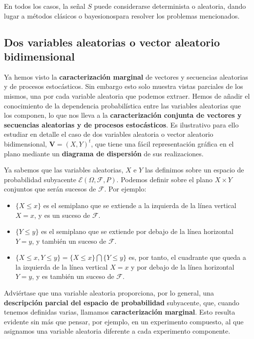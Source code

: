 \documentclass[11pt]{article}
\providecommand{\tightlist}{%
      \setlength{\itemsep}{0pt}\setlength{\parskip}{0pt}}
\begin{document}
En todos los casos, la señal \(S\) puede considerarse determinista o
aleatoria, dando lugar a métodos clásicos o bayesionospara resolver los
problemas mencionados.

    \hypertarget{dos-variables-aleatorias-o-vector-aleatorio-bidimensional}{%
\subsection{Dos variables aleatorias o vector aleatorio
bidimensional}\label{dos-variables-aleatorias-o-vector-aleatorio-bidimensional}}

Ya hemos visto la \textbf{caracterización marginal} de vectores y
secuencias aleatorias y de procesos estocásticos. Sin embargo esto solo
muestra vistas parciales de los mismos, una por cada variable aleatoria
que podemos extraer. Hemos de añadir el conocimiento de la dependencia
probabilística entre las variables aleatorias que los componen, lo que
nos lleva a la \textbf{caracterización conjunta de vectores y secuencias
aleatorias y de procesos estocásticos}. Es ilustrativo para ello
estudiar en detalle el caso de dos variables aleatoria o vector
aleatorio bidimensional, \(\mathbf V = (X, Y)^t\), que tiene una fácil
representación gráfica en el plano mediante un \textbf{diagrama de
dispersión} de sus realizaciones.

    Ya sabemos que las variables aleatorias, \(X\) e \(Y\) las definimos
sobre un espacio de probabilidad subyacente
\(\mathscr{E}(\Omega, \mathscr{F}, P)\). Podemos definir sobre el plano
\(X \times Y\) conjuntos que serán sucesos de \(\mathscr{F}\). Por
ejemplo:

\begin{itemize}
\tightlist
\item
  \(\{X \leq x\}\) es el semiplano que se extiende a la izquierda de la
  línea vertical \(X = x\), y es un suceso de \(\mathscr{F}\).
\item
  \(\{Y \leq y\}\) es el semiplano que se extiende por debajo de la
  línea horizontal \(Y = y\), y también un suceso de \(\mathscr{F}\).
\item
  \(\{X\leq x, Y\leq y\} = \{X \leq x\} \bigcap \{Y \leq y\}\) es, por
  tanto, el cuadrante que queda a la izquierda de la línea vertical
  \(X = x\) y por debajo de la línea horizontal \(Y = y\), y es también
  un suceso de \(\mathscr{F}\).
\end{itemize}

Adviértase que una variable aleatoria proporciona, por lo general, una
\textbf{descripción parcial del espacio de probabilidad} subyacente,
que, cuando tenemos definidas varias, llamamos \textbf{caracterización
marginal}. Esto resulta evidente sin más que pensar, por ejemplo, en un
experimento compuesto, al que asignamos una variable aleatoria diferente
a cada experimento componente.
\end{document}
